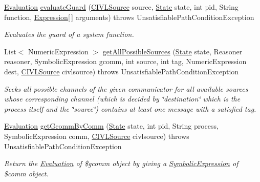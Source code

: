 \begin{DoxyCompactItemize}
\item 
\hyperlink{classedu_1_1udel_1_1cis_1_1vsl_1_1civl_1_1semantics_1_1IF_1_1Evaluation}{Evaluation} \hyperlink{classedu_1_1udel_1_1cis_1_1vsl_1_1civl_1_1library_1_1comm_1_1LibcommEvaluator_aad21a311a582cb5e0712a3d13c885962}{evaluate\+Guard} (\hyperlink{interfaceedu_1_1udel_1_1cis_1_1vsl_1_1civl_1_1model_1_1IF_1_1CIVLSource}{C\+I\+V\+L\+Source} source, \hyperlink{interfaceedu_1_1udel_1_1cis_1_1vsl_1_1civl_1_1state_1_1IF_1_1State}{State} state, int pid, String function, \hyperlink{interfaceedu_1_1udel_1_1cis_1_1vsl_1_1civl_1_1model_1_1IF_1_1expression_1_1Expression}{Expression}\mbox{[}$\,$\mbox{]} arguments)  throws Unsatisfiable\+Path\+Condition\+Exception 
\begin{DoxyCompactList}\small\item\em Evaluates the guard of a system function. \end{DoxyCompactList}\item 
List$<$ Numeric\+Expression $>$ \hyperlink{classedu_1_1udel_1_1cis_1_1vsl_1_1civl_1_1library_1_1comm_1_1LibcommEvaluator_ac2e504d0dc156c0f51fb41fe5e2ede78}{get\+All\+Possible\+Sources} (\hyperlink{interfaceedu_1_1udel_1_1cis_1_1vsl_1_1civl_1_1state_1_1IF_1_1State}{State} state, Reasoner reasoner, Symbolic\+Expression gcomm, int source, int tag, Numeric\+Expression dest, \hyperlink{interfaceedu_1_1udel_1_1cis_1_1vsl_1_1civl_1_1model_1_1IF_1_1CIVLSource}{C\+I\+V\+L\+Source} civlsource)  throws Unsatisfiable\+Path\+Condition\+Exception 
\begin{DoxyCompactList}\small\item\em Seeks all possible channels of the given communicator for all available sources whose corresponding channel (which is decided by \char`\"{}destination\char`\"{} which is the process itself and the \char`\"{}source\char`\"{}) contains at least one message with a satisfied tag. \end{DoxyCompactList}\item 
\hyperlink{classedu_1_1udel_1_1cis_1_1vsl_1_1civl_1_1semantics_1_1IF_1_1Evaluation}{Evaluation} \hyperlink{classedu_1_1udel_1_1cis_1_1vsl_1_1civl_1_1library_1_1comm_1_1LibcommEvaluator_a27f4f0ec382ee290b70787711ac23752}{get\+Gcomm\+By\+Comm} (\hyperlink{interfaceedu_1_1udel_1_1cis_1_1vsl_1_1civl_1_1state_1_1IF_1_1State}{State} state, int pid, String process, Symbolic\+Expression comm, \hyperlink{interfaceedu_1_1udel_1_1cis_1_1vsl_1_1civl_1_1model_1_1IF_1_1CIVLSource}{C\+I\+V\+L\+Source} civlsource)  throws Unsatisfiable\+Path\+Condition\+Exception 
\begin{DoxyCompactList}\small\item\em Return the \hyperlink{}{Evaluation} of \$gcomm object by giving a \hyperlink{}{Symbolic\+Expression} of \$comm object. \end{DoxyCompactList}\item 

\end{DoxyCompactItemize}

